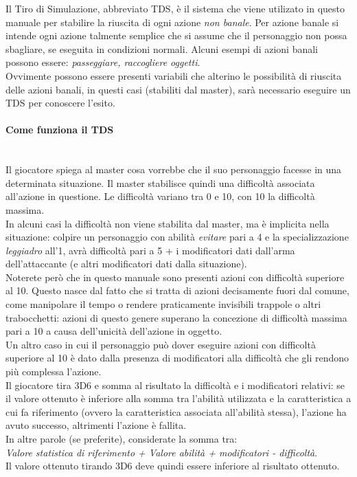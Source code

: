 \documentclass[../manuale_main.tex]{subfiles}
\begin{document}
Il Tiro di Simulazione, abbreviato TDS, è il sistema che viene utilizato in questo manuale per stabilire la riuscita di ogni azione \textit{non banale}.
Per azione banale si intende ogni azione talmente semplice che si assume che il personaggio non possa sbagliare, se eseguita in condizioni normali. Alcuni esempi di azioni banali possono essere: \textit{passeggiare, raccogliere oggetti}.\\
Ovvimente possono essere presenti variabili che alterino le possibilità di riuscita delle azioni banali, in questi casi (stabiliti dal master), sarà necessario eseguire un TDS per conoscere l'esito.

\paragraph{Come funziona il TDS}\mbox{}\\
Il giocatore spiega al master cosa vorrebbe che il suo personaggio facesse in una determinata situazione. Il master stabilisce quindi una difficoltà associata all'azione in questione. Le difficoltà variano tra 0 e 10, con 10 la difficoltà massima. \\
In alcuni casi la difficoltà non viene stabilita dal master, ma è implicita nella situazione: colpire un personaggio con abilità \textit{evitare} pari a 4 e la specializzazione \textit{leggiadro} all'1, avrà difficoltà pari a 5 + i modificatori dati dall'arma dell'attaccante (e altri modificatori dati dalla situazione).\\
Noterete però che in questo manuale sono presenti azioni con difficoltà superiore al 10. Questo nasce dal fatto che si tratta di azioni decisamente fuori dal comune, come manipolare il tempo o rendere praticamente invisibili trappole o altri trabocchetti: azioni di questo genere superano la concezione di difficoltà massima pari a 10 a causa dell'unicità dell'azione in oggetto.\\
Un altro caso in cui il personaggio può dover eseguire azioni con difficoltà superiore al 10 è dato dalla presenza di modificatori alla difficoltà che gli rendono più complessa l'azione.\\
Il giocatore tira 3D6 e somma al risultato la difficoltà e i modificatori relativi: se il valore ottenuto è inferiore alla somma tra l'abilità utilizzata e la caratteristica a cui fa riferimento (ovvero la caratteristica associata all'abilità stessa), l'azione ha avuto successo, altrimenti l'azione è fallita.\\
In altre parole (se preferite), considerate la somma tra:\\ \textit{Valore statistica di riferimento + Valore abilità + modificatori - difficoltà}. \\Il valore ottenuto tirando 3D6 deve quindi essere inferiore al risultato ottenuto.
\end{document}
